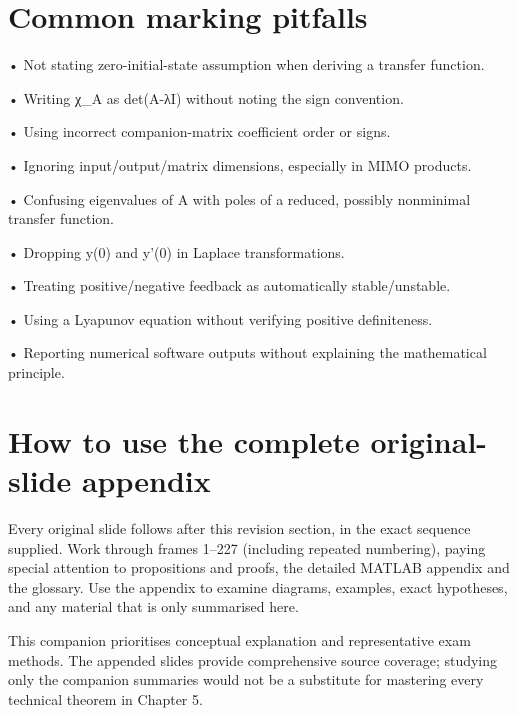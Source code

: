 \documentclass[11pt,a4paper]{article}
\begin{document}
\section{Common marking pitfalls}
\begin{studybox}• Not stating zero-initial-state assumption when deriving a transfer function.\end{studybox}
\begin{studybox}• Writing χ\_A as det(A-λI) without noting the sign convention.\end{studybox}
\begin{studybox}• Using incorrect companion-matrix coefficient order or signs.\end{studybox}
\begin{studybox}• Ignoring input/output/matrix dimensions, especially in MIMO products.\end{studybox}
\begin{studybox}• Confusing eigenvalues of A with poles of a reduced, possibly nonminimal transfer function.\end{studybox}
\begin{studybox}• Dropping y(0) and y'(0) in Laplace transformations.\end{studybox}
\begin{studybox}• Treating positive/negative feedback as automatically stable/unstable.\end{studybox}
\begin{studybox}• Using a Lyapunov equation without verifying positive definiteness.\end{studybox}
\begin{studybox}• Reporting numerical software outputs without explaining the mathematical principle.\end{studybox}

\section{How to use the complete original-slide appendix}
\begin{conceptbox}Every original slide follows after this revision section, in the exact sequence supplied. Work through frames 1–227 (including repeated numbering), paying special attention to propositions and proofs, the detailed MATLAB appendix and the glossary. Use the appendix to examine diagrams, examples, exact hypotheses, and any material that is only summarised here.\end{conceptbox}
\begin{conceptbox}This companion prioritises conceptual explanation and representative exam methods. The appended slides provide comprehensive source coverage; studying only the companion summaries would not be a substitute for mastering every technical theorem in Chapter 5.\end{conceptbox}
\end{document}
